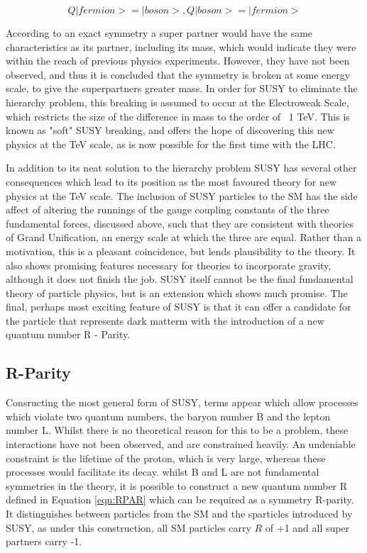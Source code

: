 \begin{equation}
Q|fermion> = |boson>, 	Q|boson> = |fermion> 
\label{eqn:Q}
\end{equation}

According to an exact symmetry a super partner would have the same characteristics as its partner, including its mass, which would indicate they were within the reach of previous physics experiments. However, they have not been observed, and thus it is concluded that the symmetry is broken at some energy scale, to give the superpartners greater mass. In order for SUSY to eliminate the hierarchy problem, this breaking is assumed to occur at the Electroweak Scale, which restricts the size of the difference in mass to the order of ~1 TeV.  This is known as "soft" SUSY breaking, and offers the hope of discovering this new physics at the TeV scale, as is now possible for the first time with the LHC. 

In addition to its neat solution to the hierarchy problem SUSY has several other consequences which lead to its position as the most favoured theory for new physics at the TeV scale. The inclusion of SUSY particles to the SM has the side affect of altering the runnings of the gauge coupling constants of the three fundamental forces, discussed above, such that they are consistent with theories of Grand Unification, an energy scale at which the three are equal. Rather than a motivation, this is a pleasant coincidence, but lends plausibility to the theory. It also shows promising features necessary for theories to incorporate gravity, although it does not finish the job. SUSY itself cannot be the final fundamental theory of particle physics, but is an extension which shows much promise. The final, perhaps most exciting feature of SUSY is that it can offer a candidate for the particle that represents dark matterm with the introduction of a new quantum number R - Parity. 



\subsection{R-Parity}

Consructing the most general form of SUSY, terms appear which allow processes which violate two quantum numbers, the baryon number B and the lepton number L. Whilst there is no theoretical reason for this to be a problem, these interactions have not been observed, and are constrained heavily. An undeniable constraint is the lifetime of the proton, which is very large, whereas these processes would facilitate its decay. whilst B and L are not fundamental symmetries in the theory, it is possible to construct a new quantum number R defined in Equation \ref{eqn:RPAR} which can be required as a symmetry R-parity. It distinguishes between particles from the SM and the sparticles introduced by SUSY, as under this construction, all SM particles carry $R$ of +1 and all super partners carry -1. 

